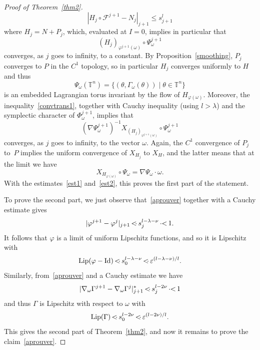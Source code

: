 \documentclass[JEP,XML,SOM,Unicode]{cedram}
\let\mathcal\mathscr
\let\sep\mid
\numberwithin{equation}{section}
\theoremstyle{plain}
\theoremstyle{definition}
\newcommand\T{\mathbb T}
\newcommand\MP{\,{<\hspace{-.5em}\cdot}\,}
\newcommand\PM{\,{\cdot\hspace{-.3em}<}\,}
\begin{document}
\begin{proof}[Proof of Theorem~\ref{thm2}]
\begin{equation}\label{convtrans1}
|H_j \circ \mathcal{F}^{j+1}-N_j|_{j+1} \leq s_{j+1}^l
\end{equation}
where $H_j=N+P_j$, which, evaluated at $I=0$, implies in particular that
\[ (H_j)_{\varphi^{j+1}(\omega)} \circ \Psi_\omega^{j+1} \]
converges, as $j$ goes to infinity, to a constant. By Proposition~\ref{smoothing}, $P_j$ converges to $P$ in the $C^1$ topology, so in particular $H_j$ converges uniformly to $H$ and thus
\[ \Psi_\omega(\T^n)=\{(\theta,\Gamma_\omega(\theta)) \sep \theta \in \T^n\} \]
is an embedded Lagrangian torus invariant by the flow of $H_{\varphi(\omega)}$. Moreover, the inequality~\eqref{convtrans1}, together with Cauchy inequality (using $l>\lambda$) and the symplectic character of $\Phi_\omega^{j+1}$, implies that
\[ (\nabla \Psi_\omega^{j+1})^{-1}X_{(H_j)_{\varphi^{j+1}(\omega)}} \circ \Psi_\omega^{j+1} \]
converges, as $j$ goes to infinity, to the vector $\omega$. Again, the $C^1$ convergence of $P_j$ to~$P$ implies the uniform convergence of $X_{H_j}$ to $X_H$, and the latter means that at the limit we have
\[ X_{H_{\varphi(\omega)}} \circ \Psi_\omega=\nabla \Psi_\omega\cdot \omega. \]
With the estimates~\eqref{est1} and~\eqref{est2}, this proves the first part of the statement.

To prove the second part, we just observe that~\eqref{aprouver} together with a Cauchy estimate gives
\[ |\varphi^{j+1}-\varphi^j|_{j+1} \MP s_j^{l-\lambda-\nu} \PM 1. \]
It follows that $\varphi$ is a limit of uniform Lipschitz functions, and so it is Lipschitz with
\[ \mathrm{Lip}(\varphi-\mathrm{Id}) \MP s_0^{l-\lambda-\nu} \MP \varepsilon^{(l-\lambda-\nu)/l}. \]
Similarly, from~\eqref{aprouver} and a Cauchy estimate we have
\[ |\nabla_\omega\Gamma^{j+1} - \nabla _\omega \Gamma^j|_{j+1}^* \MP s_j^{l-2\nu} \PM 1\]
and thus $\Gamma$ is Lipschitz with respect to $\omega$ with
\[ \mathrm{Lip}(\Gamma) \MP s_0^{l-2\nu} \MP \varepsilon^{(l-2\nu)/l}.\]
This gives the second part of Theorem~\ref{thm2}, and now it remains to prove the claim~\eqref{aprouver}.


\end{proof}
\end{document}
